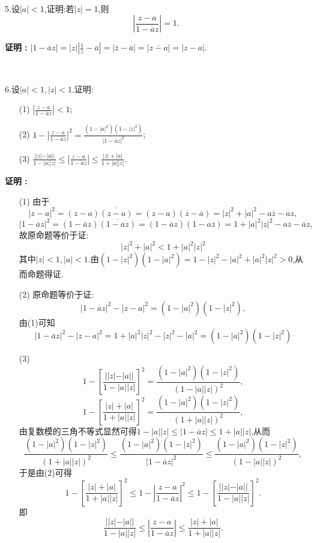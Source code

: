 \documentclass[12pt,fontset=none]{ctexbook}
\newenvironment{proof}[1][]{\par \noindent \textbf{\hspace{2em}证明 \vspace{0.1mm} #1 :}}{\par}
\renewcommand{\i}{\mathrm{i}}
\newcommand{\e}{\mathrm{e}}
\newcommand{\Lin}[1]{\overline{#1}}
\begin{document}
\

5.设$|a| <1 $,证明:若$|z|=1$,则
$$\left|\frac{z-a}{1-\Lin{a}z}\right|=1.$$
\begin{proof}
    $|1-\Lin{a}z|=|z|\left|\frac{1}{z}-\Lin{a}\right|=|\Lin{z}-\Lin{a}|=|\Lin{z-a}|=|z-a|.$
\end{proof}

\

6.设$|a| < 1,|z| <1$.证明:
\begin{enumerate}
  \item[(1)] $\left|\frac{z-a}{1-\Lin{a}z}\right| < 1$;
  \item[(2)] $1-\left|\frac{z-a}{1-\Lin{a}z}\right|^{2}=\frac{(1-|a|^{2})(1-|z|^{2})}{|1-\Lin{a}z|^{2}}$;
  \item[(3)] $\frac{||z|-|a||}{1-|a||z|} \leqslant \left|\frac{z-a}{1-\Lin{a}z}\right| \leqslant \frac{|z|+|a|}{1+|a||z|}$.   
\end{enumerate}
\begin{proof}
    \begin{enumerate}
      \item[(1)] 由于
      $$|z-a|^{2}=(z-a)\Lin{(z-a)}=(z-a)(\Lin{z}-\Lin{a})=|z|^{2}+|a|^{2}-a\Lin{z}-\Lin{a}z,$$
      $$|1-\Lin{a}z|^{2}=(1-\Lin{a}z)\Lin{(1-\Lin{a}z)}=(1-\Lin{a}z)(1-a\Lin{z})=1+|a|^{2}|z|^{2}-a\Lin{z}-\Lin{a}z,$$
      故原命题等价于证:
      $$|z|^{2}+|a|^{2} < 1+|a|^{2}|z|^{2} $$
      其中$|z|<1,|a|<1$.由$(1-|z|^{2})(1-|a|^{2})=1-|z|^{2}-|a|^{2}+|a|^{2}|z|^{2} > 0$,从而命题得证.
      \item[(2)] 原命题等价于证:
      $$|1-\Lin{a}z|^{2}-|z-a|^{2}=(1-|a|^{2})(1-|z|^{2}),$$
      由(1)可知
      $$|1-\Lin{a}z|^{2}-|z-a|^{2}=1+|a|^{2}|z|^{2}-|z|^{2}-|a|^{2}=(1-|a|^{2})(1-|z|^{2})$$
      \item[(3)] $$1-\left[\frac{||z|-|a||}{1-|a||z|}\right]^{2}=\frac{(1-|a|^{2})(1-|z|^{2})}{(1-|a||z|)^{2}},$$
      $$1-\left[\frac{|z|+|a|}{1+|a||z|}\right]^{2}=\frac{(1-|a|^{2})(1-|z|^{2})}{(1+|a||z|)^{2}},$$
      由复数模的三角不等式显然可得$1-|a||z| \leqslant |1-\Lin{a}z| \leqslant 1+|a||z|$,从而
      $$\frac{(1-|a|^{2})(1-|z|^{2})}{(1+|a||z|)^{2}} \leqslant \frac{(1-|a|^{2})(1-|z|^{2})}{|1-\Lin{a}z|^{2}} \leqslant   \frac{(1-|a|^{2})(1-|z|^{2})}{(1-|a||z|)^{2}},$$ 
      于是由(2)可得
      $$1-\left[\frac{|z|+|a|}{1+|a||z|}\right]^{2} \leqslant 1-\left|\frac{z-a}{1-\Lin{a}z}\right|^{2} \leqslant 1-\left[\frac{||z|-|a||}{1-|a||z|}\right]^{2}.$$
      即
      $$\frac{||z|-|a||}{1-|a||z|} \leqslant \left|\frac{z-a}{1-\Lin{a}z}\right| \leqslant \frac{|z|+|a|}{1+|a||z|}.$$
    \end{enumerate}
\end{proof}
\end{document}
